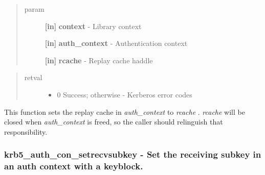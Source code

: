 \documentclass[letterpaper,10pt,english]{sphinxmanual}
\begin{document}
\begin{fulllineitems}
\label{appdev/refs/api/krb5_auth_con_setrcache:krb5_auth_con_setrcache}
\end{fulllineitems}

\begin{quote}\begin{description}
\item[{param}] \leavevmode
\textbf{{[}in{]}} \textbf{context} - Library context

\textbf{{[}in{]}} \textbf{auth\_context} - Authentication context

\textbf{{[}in{]}} \textbf{rcache} - Replay cache haddle

\end{description}\end{quote}
\begin{quote}\begin{description}
\item[{retval}] \leavevmode\begin{itemize}
\item {} 
0   Success; otherwise - Kerberos error codes

\end{itemize}

\end{description}\end{quote}

This function sets the replay cache in \emph{auth\_context} to \emph{rcache} . \emph{rcache} will be closed when \emph{auth\_context} is freed, so the caller should relinguish that responsibility.


\subsubsection{krb5\_auth\_con\_setrecvsubkey -  Set the receiving subkey in an auth context with a keyblock.}
\label{appdev/refs/api/krb5_auth_con_setrecvsubkey:krb5-auth-con-setrecvsubkey-set-the-receiving-subkey-in-an-auth-context-with-a-keyblock}\label{appdev/refs/api/krb5_auth_con_setrecvsubkey::doc}
\end{document}
